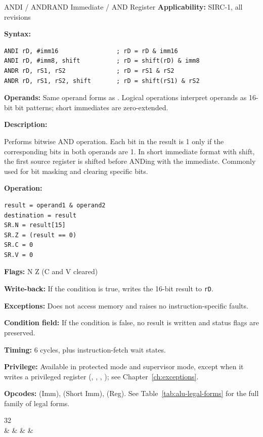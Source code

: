 \begin{instructionbox}{ANDI / ANDR}{AND Immediate / AND Register}
	\textbf{Applicability:} SIRC-1, all revisions

	\textbf{Syntax:}
	\begin{lstlisting}
ANDI rD, #imm16                ; rD = rD & imm16
ANDI rD, #imm8, shift          ; rD = shift(rD) & imm8
ANDR rD, rS1, rS2              ; rD = rS1 & rS2
ANDR rD, rS1, rS2, shift       ; rD = shift(rS1) & rS2
\end{lstlisting}

	\textbf{Operands:} Same operand forms as . Logical operations interpret operands as 16-bit bit
	patterns; short immediates are zero-extended.

	\textbf{Description:}

	Performs bitwise AND operation. Each bit in the result is 1 only if the corresponding bits in both operands are 1. In
	short immediate format with shift, the first source register is shifted before ANDing with the immediate. Commonly used
	for bit masking and clearing specific bits.

	\textbf{Operation:}
	\begin{verbatim}
result = operand1 & operand2
destination = result
SR.N = result[15]
SR.Z = (result == 0)
SR.C = 0
SR.V = 0
\end{verbatim}

	\textbf{Flags:} N Z (C and V cleared)

	\textbf{Write-back:} If the condition is true, writes the 16-bit result to \texttt{rD}.

	\textbf{Exceptions:} Does not access memory and raises no instruction-specific faults.

	\textbf{Condition field:} If the condition is false, no result is written and status flags are preserved.

	\textbf{Timing:} 6 cycles, plus instruction-fetch wait states.

	\textbf{Privilege:} Available in protected mode and supervisor mode, except when it writes a
	privileged register (, , , ); see Chapter~\ref{ch:exceptions}.

	\textbf{Opcodes:}  (Imm),  (Short Imm),  (Reg). See Table~\ref{tab:alu-legal-forms} for the full family of legal forms.

	\begin{center}
		\begin{bytefield}[bitwidth=1.1em]{32}
			 \\
			 &
			 &
			 &
			 &
		\end{bytefield}
	\end{center}


\end{instructionbox}
